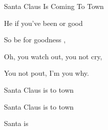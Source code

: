 \begin{SBSong}{Santa Claus Is Coming To Town}
\begin{SBVerse}
	He  if you've been  or good

	So be  for goodness ,
  \end{SBVerse}
  \begin{SBVerse}
	Oh, you  watch out, you  not cry,

	You  not pout, I'm  you why.
	
	 Santa Claus is  to town

	 Santa Claus is  to town

	 Santa  is   
  \end{SBVerse}
\end{SBSong}

